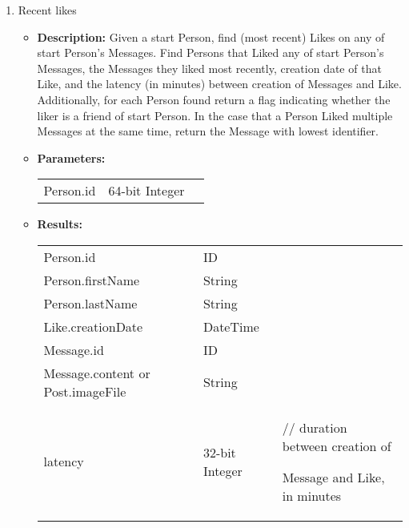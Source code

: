{\begin{enumerate}
    \item Recent likes
        \begin{itemize}
            \item \textbf{Description:}
                Given a start Person, find (most recent) Likes on any of start
                Person's Messages.  Find Persons that Liked any of start
                Person's Messages, the Messages they liked most recently,
                creation date of that Like, and the latency (in minutes) between
                creation of Messages and Like.  Additionally, for each Person
                found return a flag indicating whether the liker is a friend of
                start Person.  In the case that a Person Liked multiple Messages
                at the same time, return the Message with lowest identifier.
            \item \textbf{Parameters:} \\
                \begin{tabular}{lll}
                    Person.id 	 						& 64-bit Integer & \parbox[t]{20cm}{\par \strut} \\
                \end{tabular}		
            \item \textbf{Results:} \\
                \begin{tabular}{lll}
                    Person.id 	 								& ID & \parbox[t]{20cm}{\par \strut} \\
                    Person.firstName 							& String & \parbox[t]{20cm}{\par \strut} \\
                    Person.lastName 	 						& String & \parbox[t]{20cm}{\par \strut} \\
                    Like.creationDate 	 						& DateTime & \parbox[t]{20cm}{\par \strut} \\
                    Message.id 	 						& ID & \parbox[t]{20cm}{\par \strut} \\
                    Message.content or Post.imageFile	& String & \parbox[t]{20cm}{\par \strut} \\
                    latency 	 								& 32-bit Integer &
                    \parbox[t]{20cm}{// duration between creation of\par Message and Like, in minutes\strut} \\

\end{tabular}
\end{itemize}
\end{enumerate}}
